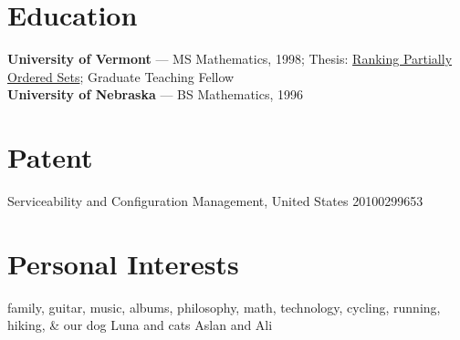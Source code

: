 \documentclass[10pt,letterpaper]{article}
\begin{document}
\section{Education}
\textbf{University of Vermont} --- MS Mathematics, 1998; Thesis: \href{https://web.archive.org/web/20251230112235/https://citeseerx.ist.psu.edu/viewdoc/download?doi=10.1.1.28.2960&rep=rep1&type=pdf}{Ranking Partially Ordered Sets}; Graduate Teaching Fellow\\
\textbf{University of Nebraska} --- BS Mathematics, 1996

\section{Patent}
{\small Serviceability and Configuration Management, United States 20100299653}

\section{Personal Interests}
{\small family, guitar, music, albums, philosophy, math, technology, cycling, running, hiking, \& our dog Luna and cats Aslan and Ali}
\end{document}
